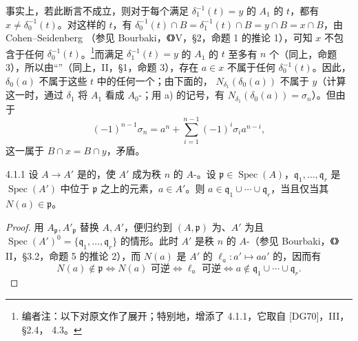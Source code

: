事实上，若此断言不成立，则对于每个满足 $\delta_1^{-1}(t)=y$ 的 $A_1$ 的 $t$，都有 $x\ne\delta_0^{-1}(t)$。对这样的 $t$，有 $\delta_0^{-1}(t)\cap B=\delta_1^{-1}(t)\cap B=y\cap B=x\cap B$，由 Cohen--Seidenberg （参见 Bourbaki，《》V，§2，命题 1 的推论 1），可知 $x$ 不包含于任何 $\delta_0^{-1}(t)$。\footnote{编者注：以下对原文作了展开；特别地，增添了 4.1.1，它取自 [DG70]，III，§2.4， 4.3。}而满足 $\delta_1^{-1}(t)=y$ 的 $A_1$ 的 $t$ 至多有 $n$ 个（同上，命题 3），所以由“”（同上，II，§1，命题 3），存在 $a\in x$ 不属于任何 $\delta_0^{-1}(t)$。因此，$\delta_0(a)$ 不属于这些 $t$ 中的任何一个；由下面的， $N_{\delta_1}(\delta_0(a))$ 不属于 $y$（计算这一时，通过 $\delta_1$ 将 $A_1$ 看成 $A_0$-；用 a) 的记号，有 $N_{\delta_1}(\delta_0(a))=\sigma_n$）。但由于
\[(-1)^{n-1}\sigma_n=a^n+\sum_{i=1}^{n-1}(-1)^i\sigma_i a^{n-i},\]
这一属于 $B\cap x=B\cap y$，矛盾。
\begin{SGAresult}{}{4.1.1}
设 $A\to A'$ 是的，使 $A'$ 成为秩 $n$ 的 $A$-。设 $\mathfrak p\in\operatorname{Spec}(A)$，$\mathfrak q_1,\ldots,\mathfrak q_r$ 是 $\operatorname{Spec}(A')$ 中位于 $\mathfrak p$ 之上的元素，$a\in A'$。则 $a\in\mathfrak q_1\cup\cdots\cup\mathfrak q_r$，当且仅当其 $N(a)\in\mathfrak p$。
\end{SGAresult}
\begin{proof}
用 $A_{\mathfrak p},A'_{\mathfrak p}$ 替换 $A,A'$，便归约到 $(A,\mathfrak p)$ 为、$A'$ 为且 $\operatorname{Spec}(A')^0=\{\mathfrak q_1,\ldots,\mathfrak q_r\}$ 的情形。此时 $A'$ 是秩 $n$ 的 $A$-（参见 Bourbaki，《》II，§3.2，命题 5 的推论 2），而 $N(a)$ 是 $A'$ 的 $\ell_a:a'\mapsto aa'$ 的，因而有
\[N(a)\notin\mathfrak p\iff N(a)\text{ 可逆}\iff\ell_a\text{ 可逆}\iff a\notin\mathfrak q_1\cup\cdots\cup\mathfrak q_r.\]
\end{proof}

